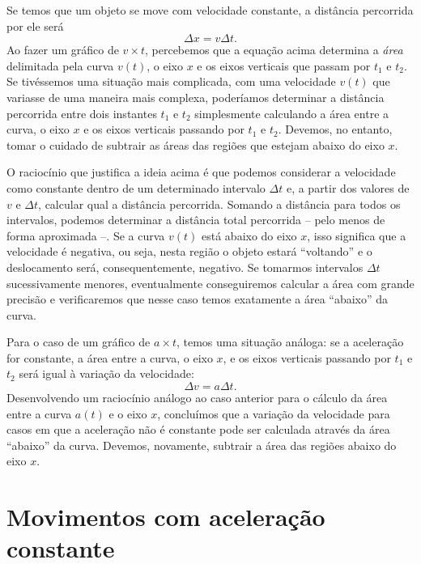 Se temos que um objeto se move com velocidade constante, a distância percorrida por ele será
\begin{equation}
  \Delta x = v \Delta t.
\end{equation}
%
Ao fazer um gráfico de $v\times t$, percebemos que a equação acima determina a \emph{área} delimitada pela curva $v(t)$, o eixo $x$ e os eixos verticais que passam por $t_1$ e $t_2$. Se tivéssemos uma situação mais complicada, com uma velocidade $v(t)$ que variasse de uma maneira mais complexa, poderíamos determinar a distância percorrida entre dois instantes $t_1$ e $t_2$ simplesmente calculando a área entre a curva, o eixo $x$ e os eixos verticais passando por $t_1$ e $t_2$. Devemos, no entanto, tomar o cuidado de subtrair as áreas das regiões que estejam abaixo do eixo $x$.

O raciocínio que justifica a ideia acima é que podemos considerar a velocidade como constante dentro de um determinado intervalo $\Delta t$ e, a partir dos valores de $v$ e $\Delta t$, calcular qual a distância percorrida. Somando a distância para todos os intervalos, podemos determinar a distância total percorrida -- pelo menos de forma aproximada --. Se a curva $v(t)$ está abaixo do eixo $x$, isso significa que a velocidade é negativa, ou seja, nesta região o objeto estará ``voltando'' e o deslocamento será, consequentemente, negativo. Se tomarmos intervalos $\Delta t$ sucessivamente menores, eventualmente conseguiremos calcular a área com grande precisão e verificaremos que nesse caso temos exatamente a área ``abaixo'' da curva.

Para o caso de um gráfico de $a \times t$, temos uma situação análoga: se a aceleração for constante, a área entre a curva, o eixo $x$, e os eixos verticais passando por $t_1$ e $t_2$ será igual à variação da velocidade:
\begin{equation}
  \Delta v = a \Delta t.
\end{equation}
%
Desenvolvendo um raciocínio análogo ao caso anterior para o cálculo da área entre a curva $a(t)$ e o eixo $x$, concluímos que a variação da velocidade para casos em que a aceleração não é constante pode ser calculada através da área ``abaixo'' da curva. Devemos, novamente, subtrair a área das regiões abaixo do eixo $x$.

\section{Movimentos com aceleração constante}

